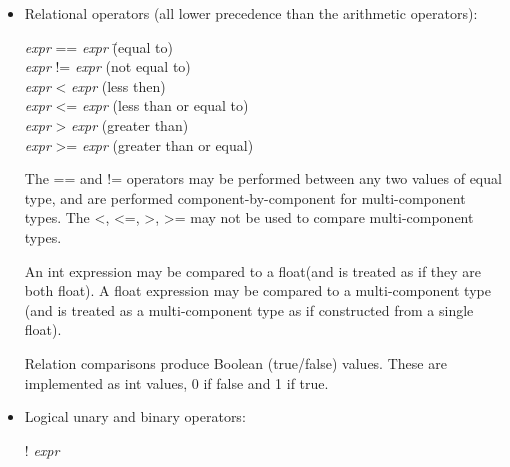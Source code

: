 \documentclass[11pt,letterpaper]{book}
\def\float{{\cf float}\xspace}
\def\inttype{{\cf int}\xspace}
\begin{document}
\begin{itemize}
The integer and bit-wise operators {\cf \%}, {\cf <<}, {\cf >>},
{\cf \&}, {\cf |}, {\cf \textasciicircum}, and {\cf \textasciitilde} may only be 
used with expressions of type \inttype.

For details on which operators are allowed, please consult the operator
tables for each individual type in Chapter~\ref{chap:types}.

\item Relational operators (all lower precedence than the arithmetic
operators):

\begin{tabbing}
\hspace{0.25in} \emph{expr} {\cf ==} \emph{expr} \hspace{1in} \= (equal to) \\
\hspace{0.25in} \emph{expr} {\cf !=} \emph{expr} \> (not equal to) \\
\hspace{0.25in} \emph{expr} {\cf <} \emph{expr} \> (less then) \\
\hspace{0.25in} \emph{expr} {\cf <=} \emph{expr} \> (less than or equal to) \\
\hspace{0.25in} \emph{expr} {\cf >} \emph{expr} \> (greater than) \\
\hspace{0.25in} \emph{expr} {\cf >=} \emph{expr} \> (greater than or equal) \\
\end{tabbing}

The {\cf ==} and {\cf !=} operators may be performed between any two
values of equal type, and are performed component-by-component for
multi-component types.  The {\cf <}, {\cf <=}, {\cf >}, {\cf >=} may not
be used to compare multi-component types.

An \inttype expression may be compared to a \float (and is treated as if
they are both \float).  A \float expression may be compared to a
multi-component type (and is treated as a multi-component type as if
constructed from a single float).

Relation comparisons produce Boolean (true/false) values.  These
are implemented as \inttype values, 0 if false and 1 if true.

\item Logical unary and binary operators:

\hspace{0.5in}    {\cf !} \emph{expr}


\end{itemize}
\end{document}
